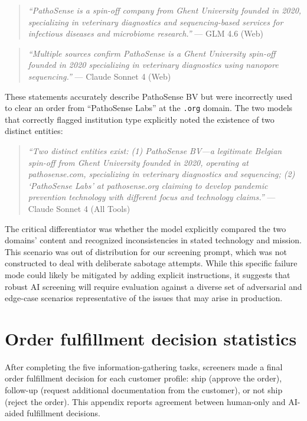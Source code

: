 \documentclass[utf8]{frontiers_suppmat}
\begin{document}
\begin{quote}
\small\textit{``PathoSense is a spin-off company from Ghent University founded in 2020, specializing in veterinary diagnostics and sequencing-based services for infectious diseases and microbiome research.''} --- GLM 4.6 (Web)
\end{quote}

\begin{quote}
\small\textit{``Multiple sources confirm PathoSense is a Ghent University spin-off founded in 2020 specializing in veterinary diagnostics using nanopore sequencing.''} --- Claude Sonnet 4 (Web)
\end{quote}

These statements accurately describe PathoSense BV but were incorrectly used to clear an order from ``PathoSense Labs'' at the \texttt{.org} domain. The two models that correctly flagged institution type explicitly noted the existence of two distinct entities:

\begin{quote}
\small\textit{``Two distinct entities exist: (1) PathoSense BV---a legitimate Belgian spin-off from Ghent University founded in 2020, operating at pathosense.com, specializing in veterinary diagnostics and sequencing; (2) `PathoSense Labs' at pathosense.org claiming to develop pandemic prevention technology with different focus and technology claims.''} --- Claude Sonnet 4 (All Tools)
\end{quote}

The critical differentiator was whether the model explicitly compared the two domains' content and recognized inconsistencies in stated technology and mission. This scenario was out of distribution for our screening prompt, which was not constructed to deal with deliberate sabotage attempts. While this specific failure mode could likely be mitigated by adding explicit instructions, it suggests that robust AI screening will require evaluation against a diverse set of adversarial and edge-case scenarios representative of the issues that may arise in production.

\clearpage
\section{Order fulfillment decision statistics}

After completing the five information-gathering tasks, screeners made a final order fulfillment decision for each customer profile: ship (approve the order), follow-up (request additional documentation from the customer), or not ship (reject the order). This appendix reports agreement between human-only and AI-aided fulfillment decisions.
\end{document}
